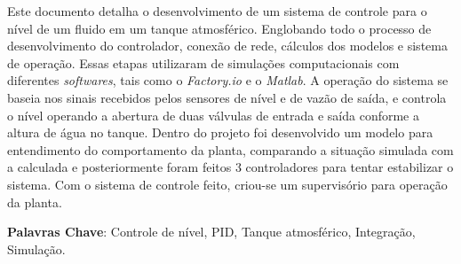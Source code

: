 \documentclass[
	article,			%
	11pt,				%
	oneside,			%
	a4paper,			%
	section=TITLE,		%
	english,			%
	brazil,				%
	sumario=tradicional
	]{abntex2}
\newcommand{\factorio}{\textit{Factory.io}}%
\begin{document}
\begin{resumoumacoluna}
     Este documento detalha o desenvolvimento de um sistema de controle para o nível de um fluido em um tanque atmosférico. Englobando todo o processo de desenvolvimento do controlador, conexão de rede, cálculos dos modelos e sistema de operação. Essas etapas utilizaram de simulações computacionais com diferentes \textit{softwares}, tais como o \factorio{} e o \textit{Matlab}. A operação do sistema se baseia nos sinais recebidos pelos sensores de nível e de vazão de saída, e controla o nível operando a abertura de duas válvulas de entrada e saída conforme a altura de água no tanque. Dentro do projeto foi desenvolvido um modelo para entendimento do comportamento da planta, comparando a situação simulada com a calculada e posteriormente foram feitos 3 controladores para tentar estabilizar o sistema. Com o sistema de controle feito, criou-se um supervisório para operação da planta. %

    
     \vspace{\onelineskip}
     \noindent
     \textbf{Palavras Chave}: Controle de nível, PID, Tanque atmosférico, Integração, Simulação.
 \end{resumoumacoluna}

\end{document}

